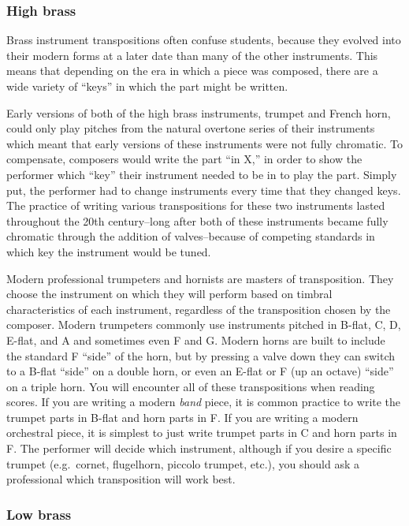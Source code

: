 \documentclass{book}
\begin{document}
\hypertarget{high-brass}{%
\subsubsection{High brass}\label{high-brass}}

Brass instrument transpositions often confuse students, because they evolved
into their modern forms at a later date than many of the other instruments.
This means that depending on the era in which a piece was composed, there are
a wide variety of ``keys'' in which the part might be written.

Early versions of both of the high brass instruments, trumpet and French horn,
could only play pitches from the natural overtone series of their instruments
which meant that early versions of these instruments were not fully chromatic.
To compensate, composers would write the part ``in X,'' in order to show the
performer which ``key'' their instrument needed to be in to play the part.
Simply put, the performer had to change instruments every time that they
changed keys. The practice of writing various transpositions for these two
instruments lasted throughout the 20th century--long after both of these
instruments became fully chromatic through the addition of valves--because of
competing standards in which key the instrument would be tuned.

Modern professional trumpeters and hornists are masters of transposition. They
choose the instrument on which they will perform based on timbral
characteristics of each instrument, regardless of the transposition chosen by
the composer. Modern trumpeters commonly use instruments pitched in B-flat, C,
D, E-flat, and A and sometimes even F and G. Modern horns are built to include
the standard F ``side'' of the horn, but by pressing a valve down they can
switch to a B-flat ``side'' on a double horn, or even an E-flat or F (up an
octave) ``side'' on a triple horn. You will encounter all of these
transpositions when reading scores. If you are writing a modern \emph{band}
piece, it is common practice to write the trumpet parts in B-flat and horn
parts in F. If you are writing a modern orchestral piece, it is simplest to
just write trumpet parts in C and horn parts in F. The performer will decide
which instrument, although if you desire a specific trumpet (e.g.~cornet,
flugelhorn, piccolo trumpet, etc.), you should ask a professional which
transposition will work best.

\hypertarget{low-brass}{%
\subsubsection{Low brass}\label{low-brass}}
\end{document}
